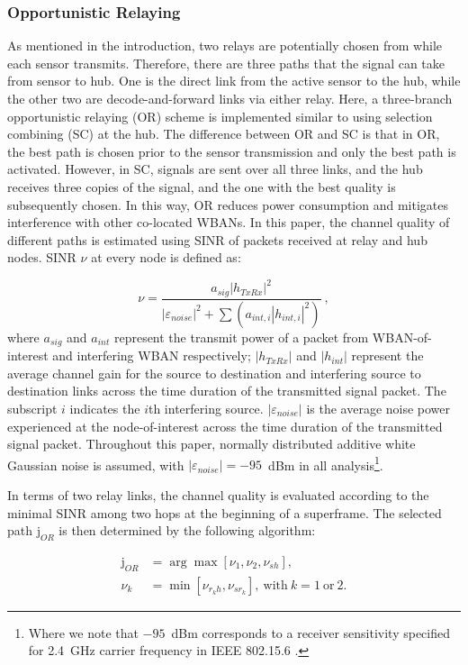 \documentclass[12pt,draftcls,a4paper,onecolumn,journal]{IEEEtran}
\begin{document}
\subsubsection{Opportunistic Relaying}
As mentioned in the introduction, two relays are potentially chosen from while each sensor transmits. Therefore, there are three paths that the signal can take from sensor to hub. One is the direct link from the active sensor to the hub, while the other two are decode-and-forward links via either relay. Here, a three-branch opportunistic relaying (OR) scheme is implemented similar to using selection combining (SC) at the hub. The difference between OR and SC is that in OR, the best path is chosen prior to the sensor transmission and only the best path is activated. However, in SC, signals are sent over all three links, and the hub receives three copies of the signal, and the one with the best quality is subsequently chosen. In this way, OR reduces power consumption and mitigates interference with other co-located WBANs. In this paper, the channel quality of different paths is estimated using SINR of packets received at relay and hub nodes. SINR $\nu$ at every node is defined as:

\begin{equation}
\nu = \frac{a_{sig}|h_{TxRx}|^2}{|\varepsilon_{noise}|^2 + \sum(a_{int,i}|h_{int,i}|^2)}~,
\label{equ:SINR}
\end{equation}
where $a_{sig}$ and $a_{int}$ represent the transmit power of a packet from WBAN-of-interest and interfering WBAN respectively; $|h_{TxRx}|$ and $|h_{int}|$ represent the average channel gain for the source to destination and interfering source to destination links across the time duration of the transmitted signal packet. The subscript $i$ indicates the $i$th interfering source. $|\varepsilon_{noise}|$ is the average noise power experienced at the node-of-interest across the time duration of the transmitted signal packet. Throughout this paper, normally distributed additive white Gaussian noise is assumed, with $|\varepsilon_{noise}| = -95$~dBm in all analysis\footnote{Where we note that $-95$~dBm corresponds to a receiver sensitivity specified for 2.4~GHz carrier frequency in IEEE 802.15.6 \cite{tg6_d}.}.

In terms of two relay links, the channel quality is evaluated according to the minimal SINR among two hops at the beginning of a superframe. The selected path $\mathrm{j}_{OR}$ is then determined by the following algorithm:

\begin{align}
\mathrm{j}_{OR} &= \arg \max[ \nu_{1}, \nu_{2}, \nu_{sh} ],\nonumber \\
\nu_{k} &= \min[\nu_{r_k h}, \nu_{sr_k}],\:\textrm{with}\: k = 1\:\textrm{or}\:2.
\label{equ:OR}
\end{align}
\end{document}
